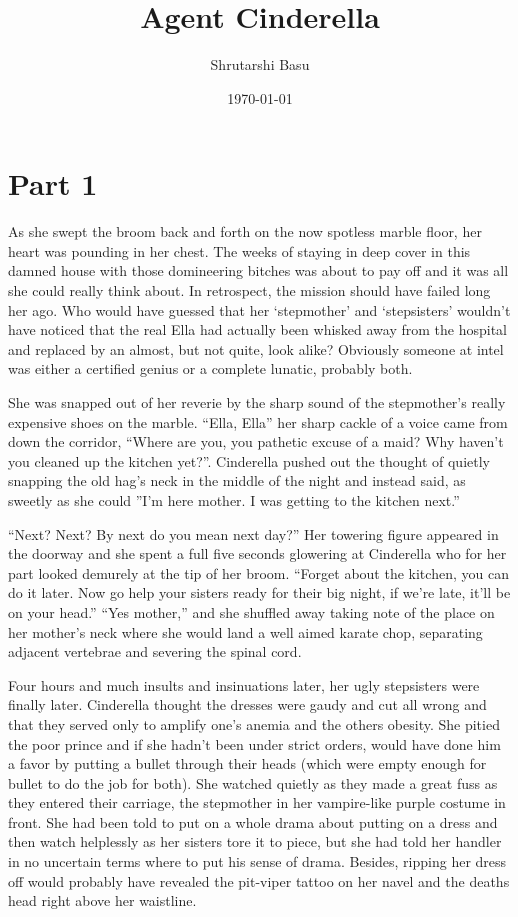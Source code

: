 \documentclass[11pt,letterpaper]{article}
\title{Agent Cinderella}
\author{Shrutarshi Basu}
\date{\today}
\begin{document}
\maketitle
\doublespacing

\section*{Part 1}

As she swept the broom back and forth on the now spotless marble floor, her heart was pounding in her chest. The weeks of staying in deep cover in this damned house with those domineering bitches was about to pay off and it was all she could really think about. In retrospect, the mission should have failed long her ago. Who would have guessed that her `stepmother' and `stepsisters' wouldn't have noticed that the real Ella had actually been whisked away from the hospital and replaced by an almost, but not quite, look alike? Obviously someone at intel was either a certified genius or a complete lunatic, probably both.

She was snapped out of her reverie by the sharp sound of the stepmother's really expensive shoes on the marble. ``Ella, Ella'' her sharp cackle of a voice came from down the corridor, ``Where are you, you pathetic excuse of a maid? Why haven't you cleaned up the kitchen yet?''. Cinderella pushed out the thought of quietly snapping the old hag's neck in the middle of the night and instead said, as sweetly as she could ''I'm here mother. I was getting to the kitchen next.''

``Next? Next? By next do you mean next day?'' Her towering figure appeared in the doorway and she spent a full five seconds glowering at Cinderella who for her part looked demurely at the tip of her broom. ``Forget about the kitchen, you can do it later. Now go help your sisters ready for their big night, if we're late, it'll be on your head.'' ``Yes mother,'' and she shuffled away taking note of the place on her mother's neck where she would land a well aimed karate chop, separating adjacent vertebrae and severing the spinal cord.

Four hours and much insults and insinuations later, her ugly stepsisters were finally later. Cinderella thought the dresses were gaudy and cut all wrong and that they served only to amplify one's anemia and the others obesity. She pitied the poor prince and if she hadn't been under strict orders, would have done him a favor by putting a bullet through their heads (which were empty enough for bullet to do the job for both). She watched quietly as they made a great fuss as they entered their carriage, the stepmother in her vampire-like purple costume in front. She had been told to put on a whole drama about putting on a dress and then watch helplessly as her sisters tore it to piece, but she had told her handler in no uncertain terms where to put his sense of drama. Besides, ripping her dress off would probably have revealed the pit-viper tattoo on her navel and the deaths head right above her waistline.
\end{document}
